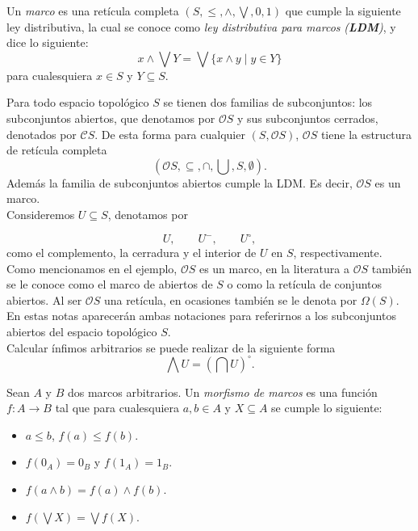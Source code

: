 \begin{dfn}\label{frm}
Un \emph{marco} es una retícula completa $(S, \leq, \wedge, \bigvee, 0, 1)$ que cumple la siguiente ley distributiva, la cual se conoce como  \emph{ley distributiva para marcos} \emph{(\textbf{LDM})}, y dice lo siguiente:
\[
x\wedge\bigvee Y=\bigvee\{x\wedge y\mid y\in Y\}
\]
para cualesquiera $x\in S$ y $Y\subseteq S$.
\end{dfn}

\begin{ej}\label{ejem1}
Para todo espacio topológico $S$ se tienen dos familias de subconjuntos: los subconjuntos abiertos, que denotamos por $\mathcal{O}S$ y sus subconjuntos cerrados, denotados por $\mathcal{C}S$. De esta forma para cualquier $(S,\mathcal{O}S)$, $\mathcal{O}S$ tiene la estructura  de retícula completa $$(\mathcal{O}S, \subseteq, \cap,\bigcup, S,\emptyset).$$
Además la familia de subconjuntos abiertos cumple la LDM. Es decir, $\mathcal{O}S$ es un marco.\\

Consideremos $U\subseteq S$, denotamos por

\[
U,\qquad U^-,\qquad U^\circ,
\]
como el complemento, la cerradura y el interior de $U$ en $S$, respectivamente.\\ 

Como mencionamos en el ejemplo, $\mathcal{O}S$ es un marco, en la literatura a $\mathcal{O}S$ también se le conoce como el marco de abiertos de $S$ o como la retícula de conjuntos abiertos. Al ser $\mathcal{O}S$ una retícula, en ocasiones también se le denota por $\Omega(S)$. En estas notas aparecerán ambas notaciones para referirnos a los subconjuntos abiertos del espacio topológico $S$.\\

Calcular ínfimos arbitrarios se puede realizar de la siguiente forma 
\[
\bigwedge U=\left(\bigcap U\right)^\circ.
\]
\end{ej}

\begin{dfn}\label{morf}
Sean $A$ y $B$ dos marcos arbitrarios. Un \emph{morfismo de marcos} es una función $f\colon A\rightarrow B$ tal que para cualesquiera $a,b\in A$ y $X\subseteq A$ se cumple lo siguiente:
\begin{itemize}
\item $a\leq b$, $f(a)\leq f(b)$.
\item $f(0_A)=0_B$ y $f(1_A)=1_B$.
\item $f(a\wedge b)= f(a)\wedge f(b)$.
\item $f(\bigvee X)=\bigvee f(X)$.
\end{itemize}
\end{dfn}

